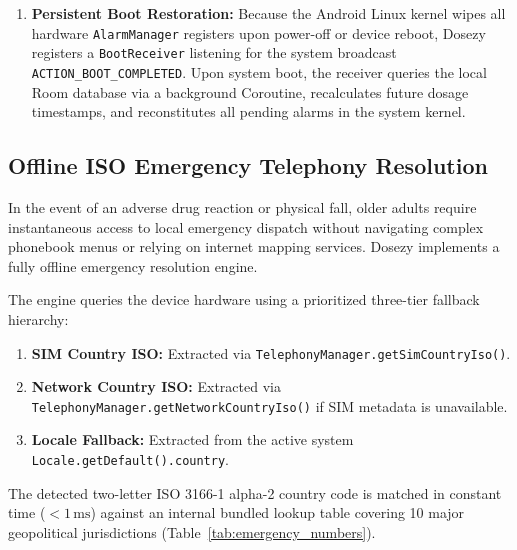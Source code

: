 \documentclass[11pt,a4paper]{article}
\begin{document}
\begin{enumerate}[leftmargin=*]
    \item \textbf{Persistent Boot Restoration:} Because the Android Linux kernel wipes all hardware \texttt{AlarmManager} registers upon power-off or device reboot, Dosezy registers a \texttt{BootReceiver} listening for the system broadcast \texttt{ACTION\_BOOT\_COMPLETED}. Upon system boot, the receiver queries the local Room database via a background Coroutine, recalculates future dosage timestamps, and reconstitutes all pending alarms in the system kernel.
\end{enumerate}

\subsection{Offline ISO Emergency Telephony Resolution}

In the event of an adverse drug reaction or physical fall, older adults require instantaneous access to local emergency dispatch without navigating complex phonebook menus or relying on internet mapping services. Dosezy implements a fully offline emergency resolution engine.

The engine queries the device hardware using a prioritized three-tier fallback hierarchy:
\begin{enumerate}
    \item \textbf{SIM Country ISO:} Extracted via \texttt{TelephonyManager.getSimCountryIso()}.
    \item \textbf{Network Country ISO:} Extracted via \texttt{TelephonyManager.getNetworkCountryIso()} if SIM metadata is unavailable.
    \item \textbf{Locale Fallback:} Extracted from the active system \texttt{Locale.getDefault().country}.
\end{enumerate}

The detected two-letter ISO 3166-1 alpha-2 country code is matched in constant time ($< 1\,\text{ms}$) against an internal bundled lookup table covering 10 major geopolitical jurisdictions (Table~\ref{tab:emergency_numbers}).
\end{document}
